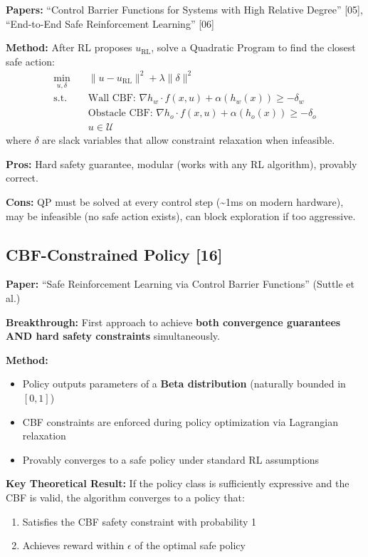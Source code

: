 \documentclass[11pt,a4paper]{report}
\begin{document}
\textbf{Papers:} ``Control Barrier Functions for Systems with High Relative Degree'' [05], ``End-to-End Safe Reinforcement Learning'' [06]

\textbf{Method:} After RL proposes $u_{\text{RL}}$, solve a Quadratic Program to find the closest safe action:
\begin{equation}
    \begin{aligned}
        \min_{u, \delta} \quad & \|u - u_{\text{RL}}\|^2 + \lambda \|\delta\|^2 \\
        \text{s.t.} \quad & \text{Wall CBF: } \nabla h_w \cdot f(x,u) + \alpha(h_w(x)) \geq -\delta_w \\
        & \text{Obstacle CBF: } \nabla h_o \cdot f(x,u) + \alpha(h_o(x)) \geq -\delta_o \\
        & u \in \mathcal{U}
    \end{aligned}
\end{equation}
where $\delta$ are slack variables that allow constraint relaxation when infeasible.

\textbf{Pros:} Hard safety guarantee, modular (works with any RL algorithm), provably correct.

\textbf{Cons:} QP must be solved at every control step (\textasciitilde 1ms on modern hardware), may be infeasible (no safe action exists), can block exploration if too aggressive.

\subsection{CBF-Constrained Policy [16]}

\textbf{Paper:} ``Safe Reinforcement Learning via Control Barrier Functions'' (Suttle et al.)

\textbf{Breakthrough:} First approach to achieve \textbf{both convergence guarantees AND hard safety constraints} simultaneously.

\textbf{Method:}
\begin{itemize}
    \item Policy outputs parameters of a \textbf{Beta distribution} (naturally bounded in $[0,1]$)
    \item CBF constraints are enforced during policy optimization via Lagrangian relaxation
    \item Provably converges to a safe policy under standard RL assumptions
\end{itemize}

\textbf{Key Theoretical Result:}
If the policy class is sufficiently expressive and the CBF is valid, the algorithm converges to a policy that:
\begin{enumerate}
    \item Satisfies the CBF safety constraint with probability 1
    \item Achieves reward within $\epsilon$ of the optimal safe policy
\end{enumerate}
\end{document}
